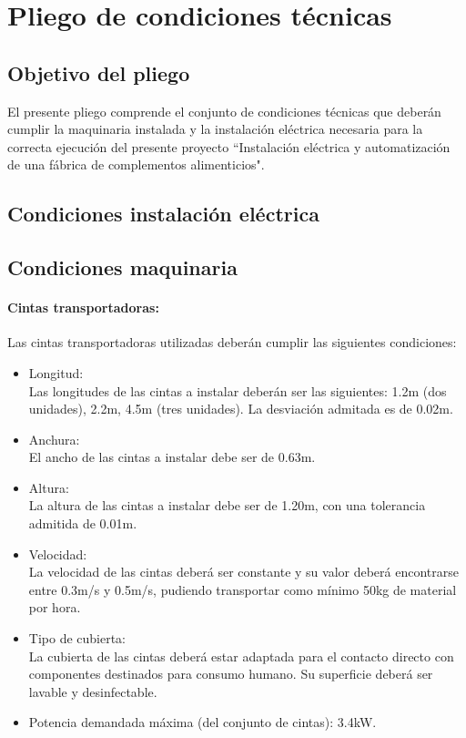 \newpage\section {Pliego de condiciones técnicas}

\subsection{Objetivo del pliego}
El presente pliego comprende el conjunto de condiciones técnicas que deberán cumplir la maquinaria instalada y la instalación eléctrica necesaria para la correcta ejecución del presente proyecto ``Instalación eléctrica y automatización de una fábrica de complementos alimenticios". 

\subsection{Condiciones instalación eléctrica}


\subsection{Condiciones maquinaria}
\paragraph{Cintas transportadoras:}
		Las cintas transportadoras utilizadas deberán cumplir las siguientes condiciones:
		
		\begin{itemize}
			\item{Longitud:}\\
			Las longitudes de las cintas a instalar deberán ser las siguientes: 1.2m (dos unidades), 2.2m, 4.5m (tres unidades). La desviación admitada es de 0.02m.  

			\item{Anchura:}\\
			El ancho de las cintas a instalar debe ser de 0.63m.

			\item{Altura:}\\
			La altura de las cintas a instalar debe ser de 1.20m, con una tolerancia admitida de 0.01m.
			
			\item{Velocidad:}\\
			La velocidad de las cintas deberá ser constante y su valor deberá encontrarse entre 0.3m/s y 0.5m/s, pudiendo transportar como mínimo 50kg de material por hora. 
			
			\item{Tipo de cubierta: }\\
			La cubierta de las cintas deberá estar adaptada para el contacto directo con componentes destinados para consumo humano. Su superficie deberá ser lavable y desinfectable.

			\item{Potencia demandada máxima (del conjunto de cintas):} 3.4kW.
		
		\end{itemize}


